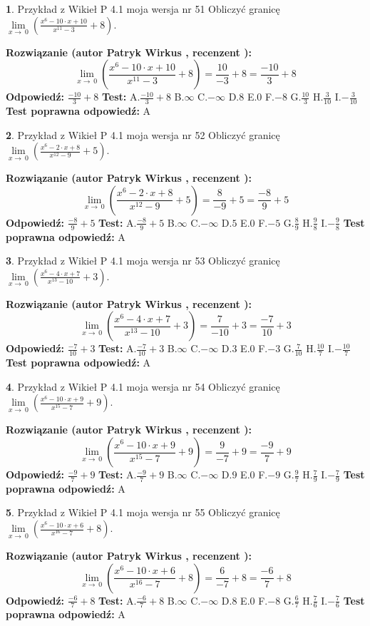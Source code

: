 \documentclass[12pt, a4paper]{article}
\theoremstyle{definition} %
\newtheorem{zad}{}
\newcommand{\zadStart}[1]{\begin{zad}#1\newline}
\newcommand{\zadStop}{\end{zad}}
\newcommand{\rozwStart}[2]{\noindent \textbf{Rozwiązanie (autor #1 , recenzent #2): }\newline}
\newcommand{\rozwStop}{\newline}
\newcommand{\odpStart}{\noindent \textbf{Odpowiedź:}\newline}
\newcommand{\odpStop}{\newline}
\newcommand{\testStart}{\noindent \textbf{Test:}\newline}
\newcommand{\testStop}{\newline}
\newcommand{\kluczStart}{\noindent \textbf{Test poprawna odpowiedź:}\newline}
\newcommand{\kluczStop}{\newline}
\begin{document}
\zadStart{Przykład z Wikieł P 4.1 moja wersja nr 51}
Obliczyć granicę $\lim\limits_{x\to\ 0}(\frac{x^{6}-10 \cdot x +10}{x^{11}-3}+8)$.
\zadStop
\rozwStart{Patryk Wirkus}{}
$$\lim\limits_{x\to\ 0}(\frac{x^{6}-10 \cdot x +10}{x^{11}-3}+8)=\frac{10}{-3}+8=\frac{-10}{3}+8$$
\rozwStop
\odpStart
$\frac{-10}{3}+8$
\odpStop
\testStart
A.$\frac{-10}{3}+8$
B.$\infty$
C.$-\infty$
D.$8$
E.$0$
F.$-8$
G.$\frac{10}{3}$
H.$\frac{3}{10}$
I.$-\frac{3}{10}$
\testStop
\kluczStart
A
\kluczStop



\zadStart{Przykład z Wikieł P 4.1 moja wersja nr 52}
Obliczyć granicę $\lim\limits_{x\to\ 0}(\frac{x^{6}-2 \cdot x +8}{x^{12}-9}+5)$.
\zadStop
\rozwStart{Patryk Wirkus}{}
$$\lim\limits_{x\to\ 0}(\frac{x^{6}-2 \cdot x +8}{x^{12}-9}+5)=\frac{8}{-9}+5=\frac{-8}{9}+5$$
\rozwStop
\odpStart
$\frac{-8}{9}+5$
\odpStop
\testStart
A.$\frac{-8}{9}+5$
B.$\infty$
C.$-\infty$
D.$5$
E.$0$
F.$-5$
G.$\frac{8}{9}$
H.$\frac{9}{8}$
I.$-\frac{9}{8}$
\testStop
\kluczStart
A
\kluczStop



\zadStart{Przykład z Wikieł P 4.1 moja wersja nr 53}
Obliczyć granicę $\lim\limits_{x\to\ 0}(\frac{x^{6}-4 \cdot x +7}{x^{13}-10}+3)$.
\zadStop
\rozwStart{Patryk Wirkus}{}
$$\lim\limits_{x\to\ 0}(\frac{x^{6}-4 \cdot x +7}{x^{13}-10}+3)=\frac{7}{-10}+3=\frac{-7}{10}+3$$
\rozwStop
\odpStart
$\frac{-7}{10}+3$
\odpStop
\testStart
A.$\frac{-7}{10}+3$
B.$\infty$
C.$-\infty$
D.$3$
E.$0$
F.$-3$
G.$\frac{7}{10}$
H.$\frac{10}{7}$
I.$-\frac{10}{7}$
\testStop
\kluczStart
A
\kluczStop



\zadStart{Przykład z Wikieł P 4.1 moja wersja nr 54}
Obliczyć granicę $\lim\limits_{x\to\ 0}(\frac{x^{6}-10 \cdot x +9}{x^{15}-7}+9)$.
\zadStop
\rozwStart{Patryk Wirkus}{}
$$\lim\limits_{x\to\ 0}(\frac{x^{6}-10 \cdot x +9}{x^{15}-7}+9)=\frac{9}{-7}+9=\frac{-9}{7}+9$$
\rozwStop
\odpStart
$\frac{-9}{7}+9$
\odpStop
\testStart
A.$\frac{-9}{7}+9$
B.$\infty$
C.$-\infty$
D.$9$
E.$0$
F.$-9$
G.$\frac{9}{7}$
H.$\frac{7}{9}$
I.$-\frac{7}{9}$
\testStop
\kluczStart
A
\kluczStop



\zadStart{Przykład z Wikieł P 4.1 moja wersja nr 55}
Obliczyć granicę $\lim\limits_{x\to\ 0}(\frac{x^{6}-10 \cdot x +6}{x^{16}-7}+8)$.
\zadStop
\rozwStart{Patryk Wirkus}{}
$$\lim\limits_{x\to\ 0}(\frac{x^{6}-10 \cdot x +6}{x^{16}-7}+8)=\frac{6}{-7}+8=\frac{-6}{7}+8$$
\rozwStop
\odpStart
$\frac{-6}{7}+8$
\odpStop
\testStart
A.$\frac{-6}{7}+8$
B.$\infty$
C.$-\infty$
D.$8$
E.$0$
F.$-8$
G.$\frac{6}{7}$
H.$\frac{7}{6}$
I.$-\frac{7}{6}$
\testStop
\kluczStart
A
\kluczStop
\end{document}

